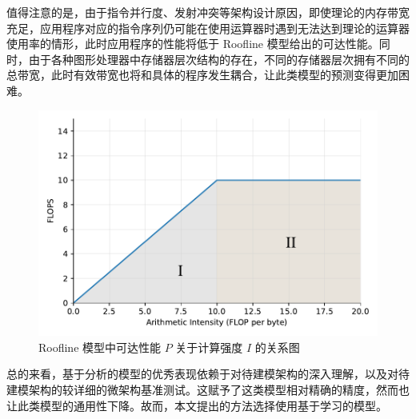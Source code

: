 值得注意的是，由于指令并行度、发射冲突等架构设计原因，即使理论的内存带宽充足，应用程序对应的指令序列仍可能在使用运算器时遇到无法达到理论的运算器使用率的情形，此时应用程序的性能将低于 Roofline 模型给出的可达性能。同时，由于各种图形处理器中存储器层次结构的存在，不同的存储器层次拥有不同的总带宽，此时有效带宽也将和具体的程序发生耦合，让此类模型的预测变得更加困难。

\begin{figure}[h]
  \centering
  \includegraphics[width=0.7\linewidth]{figures/roofline.pdf}
  \caption{Roofline 模型中可达性能 $ P $ 关于计算强度 $ I $ 的关系图}
  \label{fig:roofline_graph}
\end{figure}

总的来看，基于分析的模型的优秀表现依赖于对待建模架构的深入理解，以及对待建模架构的较详细的微架构基准测试。这赋予了这类模型相对精确的精度，然而也让此类模型的通用性下降。故而，本文提出的方法选择使用基于学习的模型。


